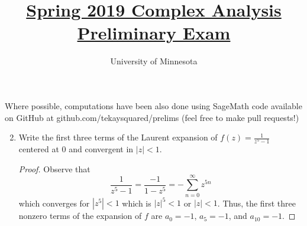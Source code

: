 \documentclass{article}
\title{\href{https://math.umn.edu/sites/math.umn.edu/files/exams/complexs19.pdf}{Spring 2019 Complex Analysis Preliminary Exam}}
\author{University of Minnesota}
\date{}
\begin{document}
\maketitle

Where possible, computations have been also done using SageMath code available on GitHub at github.com/tekaysquared/prelims (feel free to make pull requests!)

\begin{enumerate}


	\setcounter{enumi}{1}
	
	\item Write the first three terms of the Laurent expansion of $\displaystyle f(z) = \frac{1}{z^5-1}$ centered at $0$ and convergent in $|z|<1$.
	
	\begin{proof}
		Observe that \[\frac{1}{z^5-1} = \frac{-1}{1-z^5} = -\sum_{n=0}^\infty z^{5n}\]
		which converges for $|z^5|<1$ which is $|z|^5<1$ or $|z|<1$. 
		Thus, the first three nonzero terms of the expansion of $f$ are 
		$a_0 = -1$, $a_5=-1$, and $a_{10} = -1$.
	\end{proof}
\end{enumerate}
\end{document}
